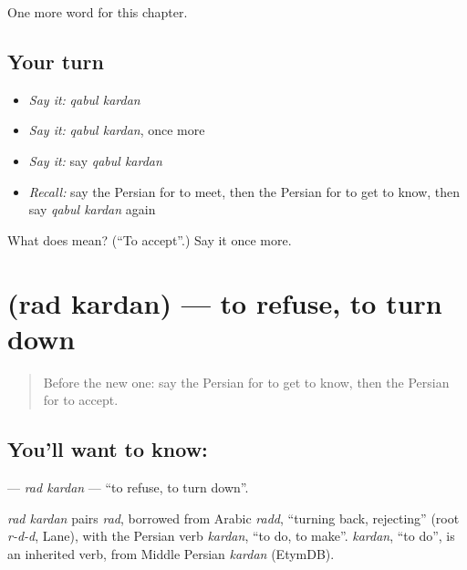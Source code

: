 \begin{grammarlens}[title={What you've built}]
One more word for this chapter.
\end{grammarlens}

\subsection*{Your turn}
\begin{itemize}
\raggedright
  \item \emph{Say it:} \emph{qabul kardan}
  \item \emph{Say it:} \emph{qabul kardan}, once more
  \item \emph{Say it:} say \emph{qabul kardan}
  \item \emph{Recall:} say the Persian for to meet, then the Persian for to get to know, then say \emph{qabul kardan} again
\end{itemize}

\begin{tcolorbox}[breakable,colback=teal!4,colframe=teal!35!black,title={Before you move on}]
What does   mean? (\textquotedblleft{}To accept\textquotedblright{}.) Say it once more.
\end{tcolorbox}
\section[\texorpdfstring{\fa{رد} \fa{کردن} (rad kardan)}{رد کردن (rad kardan)}]{  (rad kardan) — to refuse, to turn down}

\label{lesson:FA-C184-rad-kardan}



\begin{quote}
Before the new one: say the Persian for to get to know, then the Persian for to accept.
\end{quote}

\subsection*{You'll want to know:  }
\textbf{ } — \emph{rad kardan} — \textquotedblleft{}to refuse, to turn down\textquotedblright{}.

\begin{cousinweb}
\emph{rad kardan} pairs \emph{rad}, borrowed from Arabic \emph{radd}, \textquotedblleft{}turning back, rejecting\textquotedblright{} (root \emph{r-d-d}, Lane), with the Persian verb \emph{kardan}, \textquotedblleft{}to do, to make\textquotedblright{}. \emph{kardan}, \textquotedblleft{}to do\textquotedblright{}, is an inherited verb, from Middle Persian \emph{kardan} (EtymDB).
\end{cousinweb}

